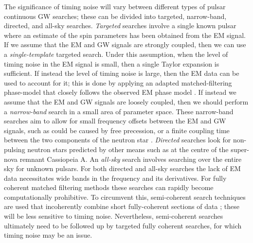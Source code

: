 \documentclass[../full_thesis/full_thesis.tex]{subfiles}
\begin{document}
The significance of timing noise will vary between different types of pulsar continuous GW
searches; these can be divided into targeted, narrow-band, directed, and
all-sky searches.  \emph{Targeted} searches involve a single known pulsar where
an estimate of the spin parameters has been obtained from the EM signal. If we
assume that the EM and GW signals are strongly coupled, then we can use a
\emph{single-template} targeted search. Under this assumption, when the level
of timing noise in the EM signal is small, then a single Taylor expansion is
sufficient.  If instead the level of timing noise is large, then the EM data
can be used to account for it; this is done by applying an adapted
matched-filtering phase-model that closely follows the observed EM phase model
\citep{Pitkin2004}. If instead we assume that the EM and GW signals are
loosely coupled, then we should perform a \emph{narrow-band} search in a small
area of parameter space.  These narrow-band searches aim to allow for small
frequency offsets between the EM and GW signals, such as could be caused by
free precession, or a finite coupling time between the two components of the
neutron star \citep{ligo2008}. \emph{Directed} searches look for non-pulsing
neutron stars predicted by other means such as at the centre of the super-nova
remnant Cassiopeia A. An \emph{all-sky} search involves searching over the
entire sky for unknown pulsars. For both directed and all-sky searches the lack
of EM data necessitates wide bands in the frequency and its derivatives. For
fully coherent matched filtering methods these searches can rapidly become
computationally prohibitive. To circumvent this, semi-coherent search
techniques are used that incoherently combine short fully-coherent sections of
data \citep{ligo2012}; these will be less sensitive to timing noise.
Nevertheless, semi-coherent searches  ultimately need to be followed up by
targeted fully coherent searches, for which timing noise may be an issue.
\end{document}

